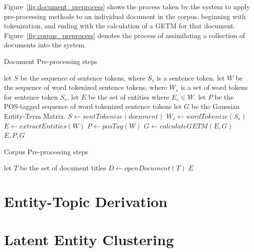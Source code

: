 \documentclass[10pt]{report}
\begin{document}
Figure~\ref{fig:document_preprocess} shows the process taken by the system to apply pre-processing methods to an individual document in the corpus. beginning with tokenization, and ending with the calculation of a GETM for that document. Figure~\ref{fig:corpus_preprocess} denotes the process of assimilating a collection of documents into the system.

\renewcommand{\baselinestretch}{1.0}\normalsize
\begin{algorithm}[H]
  \caption{Document Pre-processing steps\label{fig:document_preprocess}}
  \begin{algorithmic}
   
    \STATE let $S$ be the sequence of sentence tokens, where $S_s$ is a sentence token.
    \STATE let $W$ be the sequence of word tokenized sentence tokens, where $W_s$ is a set of word tokens for sentence token $S_s$.
    \STATE let $E$ be the set of entities where $E_e \in W$.
    \STATE let $P$ be the POS-tagged sequence of word tokenized sentence tokens
    \STATE let $G$ be the Gaussian Entity-Term Matrix.
    \STATE
    \STATE $S\gets sentTokenize(document)$
      \STATE $W_s \gets wordTokenize(S_s)$
      \ENDFOR
      \STATE 
    \STATE $E \gets extractEntities(W)$
    \STATE $P \gets posTag(W)$
    \STATE $G \gets calculateGETM(E, G)$
    \STATE
    \RETURN $E, P, G$
    
  \end{algorithmic}
\end{algorithm}
\renewcommand{\baselinestretch}{2.0}\normalsize

\renewcommand{\baselinestretch}{1.0}\normalsize
\begin{algorithm}[H]
  \caption{Corpus Pre-processing steps\label{fig:corpus_preprocess}}
  \begin{algorithmic}
    \STATE let $T$ be the set of document titles
      \STATE $D \gets openDocument(T)$
      $E$
    \ENDFOR
  \end{algorithmic}
\end{algorithm}
\renewcommand{\baselinestretch}{2.0}\normalsize

\section{Entity-Topic Derivation}

\section{Latent Entity Clustering }
\end{document}
